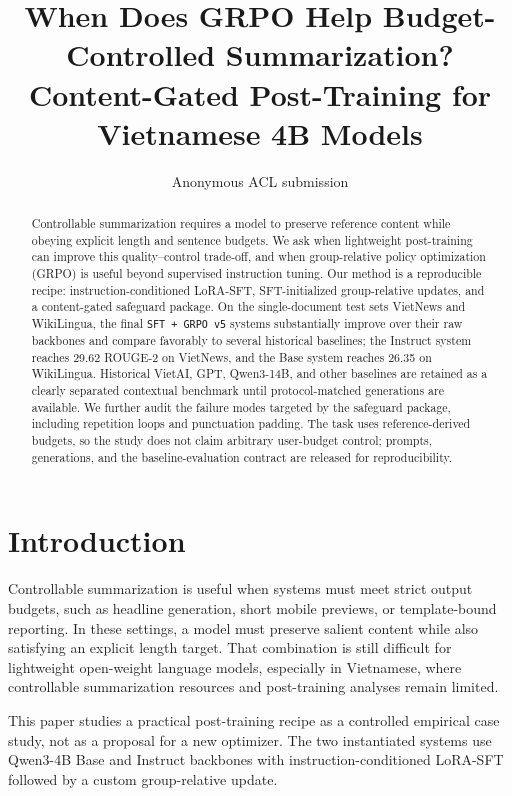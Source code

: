 \documentclass[11pt]{article}
\title{When Does GRPO Help Budget-Controlled Summarization? Content-Gated Post-Training for Vietnamese 4B Models}
\author{Anonymous ACL submission}
\begin{document}
\maketitle

\begin{abstract}
Controllable summarization requires a model to preserve reference content while obeying explicit length and sentence budgets. We ask when lightweight post-training can improve this quality--control trade-off, and when group-relative policy optimization (GRPO) is useful beyond supervised instruction tuning. Our method is a reproducible recipe: instruction-conditioned LoRA-SFT, SFT-initialized group-relative updates, and a content-gated safeguard package.
On the single-document test sets VietNews and WikiLingua, the final \texttt{SFT + GRPO v5} systems substantially improve over their raw backbones and compare favorably to several historical baselines; the Instruct system reaches 29.62 ROUGE-2 on VietNews, and the Base system reaches 26.35 on WikiLingua. Historical VietAI, GPT, Qwen3-14B, and other baselines are retained as a clearly separated contextual benchmark until protocol-matched generations are available.
We further audit the failure modes targeted by the safeguard package, including repetition loops and punctuation padding. The task uses reference-derived budgets, so the study does not claim arbitrary user-budget control; prompts, generations, and the baseline-evaluation contract are released for reproducibility.
\end{abstract}

\section{Introduction}
Controllable summarization is useful when systems must meet strict output budgets, such as headline generation, short mobile previews, or template-bound reporting.
In these settings, a model must preserve salient content while also satisfying an explicit length target.
That combination is still difficult for lightweight open-weight language models, especially in Vietnamese, where controllable summarization resources and post-training analyses remain limited.

This paper studies a practical post-training recipe as a controlled empirical case study, not as a proposal for a new optimizer. The two instantiated systems use Qwen3-4B Base and Instruct backbones with instruction-conditioned LoRA-SFT followed by a custom group-relative update.
\end{document}
